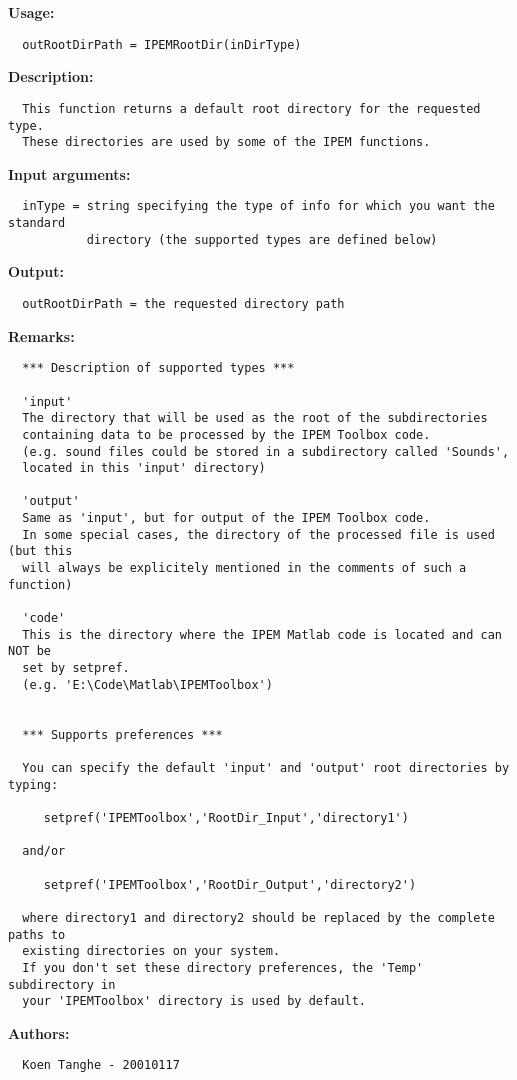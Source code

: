 \textbf{Usage:}
\begin{verbatim}  outRootDirPath = IPEMRootDir(inDirType)

\end{verbatim}
\textbf{Description:}
\begin{verbatim}  This function returns a default root directory for the requested type.
  These directories are used by some of the IPEM functions.

\end{verbatim}
\textbf{Input arguments:}
\begin{verbatim}  inType = string specifying the type of info for which you want the standard
           directory (the supported types are defined below)

\end{verbatim}
\textbf{Output:}
\begin{verbatim}  outRootDirPath = the requested directory path

\end{verbatim}
\textbf{Remarks:}
\begin{verbatim}
  *** Description of supported types ***
  
  'input'
  The directory that will be used as the root of the subdirectories
  containing data to be processed by the IPEM Toolbox code.
  (e.g. sound files could be stored in a subdirectory called 'Sounds',
  located in this 'input' directory)

  'output'
  Same as 'input', but for output of the IPEM Toolbox code.
  In some special cases, the directory of the processed file is used (but this
  will always be explicitely mentioned in the comments of such a function)

  'code'
  This is the directory where the IPEM Matlab code is located and can NOT be
  set by setpref.
  (e.g. 'E:\Code\Matlab\IPEMToolbox')


  *** Supports preferences ***

  You can specify the default 'input' and 'output' root directories by typing:

     setpref('IPEMToolbox','RootDir_Input','directory1')

  and/or

     setpref('IPEMToolbox','RootDir_Output','directory2') 

  where directory1 and directory2 should be replaced by the complete paths to
  existing directories on your system.
  If you don't set these directory preferences, the 'Temp' subdirectory in
  your 'IPEMToolbox' directory is used by default.

\end{verbatim}
\textbf{Authors:}
\begin{verbatim}  Koen Tanghe - 20010117
\end{verbatim}



